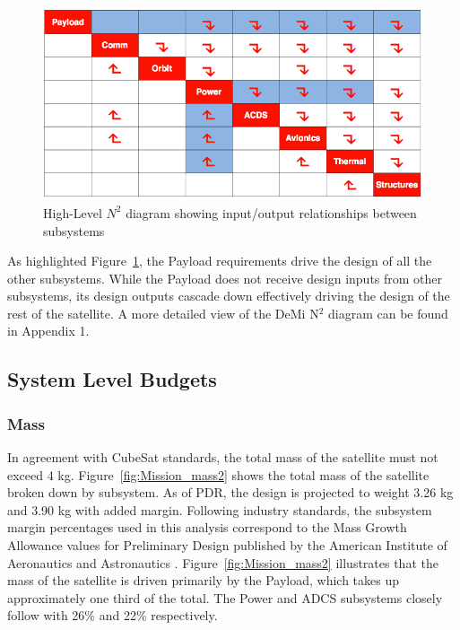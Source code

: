 \documentclass[12pt]{article}
\begin{document}
		\begin{figure}[!ht]
				\centering
				\includegraphics[width=5in]{images/MissionOverview_2.png}
				\caption{High-Level $N^2$ diagram showing input/output relationships between subsystems}
				\label{fig:Mission_N2}
			\end{figure}

		As highlighted Figure~\ref{fig:Mission_N2}, the Payload requirements drive the design of all the other subsystems. While the Payload does not receive design inputs from other subsystems, its design outputs cascade down effectively driving the design of the rest of the satellite. A more detailed view of the DeMi N$^2$ diagram can be found in Appendix 1.

	\subsection{System Level Budgets}
		\subsubsection{Mass}
		In agreement with CubeSat standards, the total mass of the satellite must not exceed 4 kg. Figure~\ref{fig:Mission_mass2} shows the total mass of the satellite broken down by subsystem. As of PDR, the design is projected to weight 3.26 kg and 3.90 kg with added margin. Following industry standards, the subsystem margin percentages used in this analysis correspond to the Mass Growth Allowance values for Preliminary Design published by the American Institute of Aeronautics and Astronautics \cite{mission_aiaa}. Figure~\ref{fig:Mission_mass2} illustrates that the mass of the satellite is driven primarily by the Payload, which takes up approximately one third of the total. The Power and ADCS subsystems closely follow with 26\% and 22\% respectively. 
\end{document}
